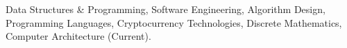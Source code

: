 

\begin{cvparagraph}

Data Structures \& Programming, Software Engineering, Algorithm Design, Programming Languages, Cryptocurrency Technologies, Discrete Mathematics, Computer Architecture (Current).
\end{cvparagraph}
